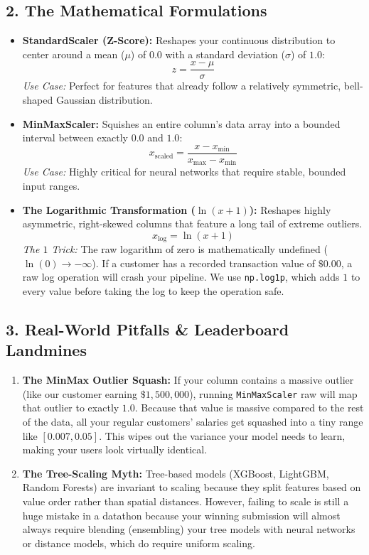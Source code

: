 \documentclass[12pt,a4paper]{article}
\begin{document}
\subsection*{2. The Mathematical Formulations}
\begin{itemize}
    \item \textbf{StandardScaler (Z-Score):} Reshapes your continuous distribution to center around a mean ($\mu$) of $0.0$ with a standard deviation ($\sigma$) of $1.0$:
    $$z = \frac{x - \mu}{\sigma}$$
    \textit{Use Case:} Perfect for features that already follow a relatively symmetric, bell-shaped Gaussian distribution.
    \item \textbf{MinMaxScaler:} Squishes an entire column's data array into a bounded interval between exactly $0.0$ and $1.0$:
    $$x_{\text{scaled}} = \frac{x - x_{\text{min}}}{x_{\text{max}} - x_{\text{min}}}$$
    \textit{Use Case:} Highly critical for neural networks that require stable, bounded input ranges.
    \item \textbf{The Logarithmic Transformation ($\ln(x+1)$):} Reshapes highly asymmetric, right-skewed columns that feature a long tail of extreme outliers.
    $$x_{\text{log}} = \ln(x + 1)$$
    \textit{The $1$ Trick:} The raw logarithm of zero is mathematically undefined ($\ln(0) \to -\infty$). If a customer has a recorded transaction value of $\$0.00$, a raw log operation will crash your pipeline. We use \texttt{np.log1p}, which adds $1$ to every value before taking the log to keep the operation safe.
\end{itemize}

\subsection*{3. Real-World Pitfalls \& Leaderboard Landmines}
\begin{enumerate}
    \item \textbf{The MinMax Outlier Squash:} If your column contains a massive outlier (like our customer earning $\$1,500,000$), running \texttt{MinMaxScaler} raw will map that outlier to exactly $1.0$. Because that value is massive compared to the rest of the data, all your regular customers' salaries get squashed into a tiny range like $[0.007, 0.05]$. This wipes out the variance your model needs to learn, making your users look virtually identical.
    \item \textbf{The Tree-Scaling Myth:} Tree-based models (XGBoost, LightGBM, Random Forests) are invariant to scaling because they split features based on value order rather than spatial distances. However, failing to scale is still a huge mistake in a datathon because your winning submission will almost always require blending (ensembling) your tree models with neural networks or distance models, which do require uniform scaling.
\end{enumerate}
\end{document}
